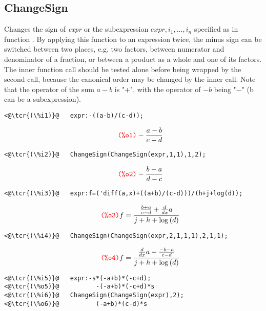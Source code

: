 \documentclass[../Maxima_Workbook.tex]{subfiles}
\begin{document}
\subsection{ChangeSign}

\lz {} \hfill {}

\lz Changes the sign of \emph{expr} or the subexpression $ expr, i_1,\dots,i_n $ specified as in function . By applying this function to an expression twice, the minus sign can be switched between two places, e.g. two factors, between numerator and denominator of a fraction, or between a product as a whole and one of its factors. The inner function call should be tested alone before being wrapped by the second call, because the canonical order may be changed by the inner call. Note that the operator of the sum $ a-b $ is "+", with the operator of $ -b $ being "$ - $" (b can be a subexpression). 

\lz \begin{small}
\color{blue} \leqn
\begin{lstlisting}
<@\tcr{(\%i1)}@   expr:-((a-b)/(c-d));
\end{lstlisting}
\vspace{-5mm} \[\tag*{\tcr{\ttfamily (\%o1)}} -\frac{a-b}{c-d} \]
\vspace{-6mm} 
\begin{lstlisting}
<@\tcr{(\%i2)}@   ChangeSign(ChangeSign(expr,1,1),1,2);
\end{lstlisting}
\vspace{-5mm} \[\tag*{\tcr{\ttfamily (\%o2)}} -\frac{b-a}{d-c} \]
\vspace{-6mm} 
\begin{lstlisting}
<@\tcr{(\%i3)}@   expr:f=('diff(a,x)+((a+b)/(c-d)))/(h+j+log(d));
\end{lstlisting}
\vspace{-4mm} \[\tag*{\tcr{\ttfamily (\%o3)}} f=\frac{\frac{b+a}{c-d}+\frac{d}{d x} a}{j+h+\log{(d)}} \]
\vspace{-5mm} 
\begin{lstlisting}
<@\tcr{(\%i4)}@   ChangeSign(ChangeSign(expr,2,1,1,1),2,1,1);
\end{lstlisting}
\vspace{-4mm} \[\tag*{\tcr{\ttfamily (\%o4)}} f=\frac{\frac{d}{d x} a-\frac{-b-a}{c-d}}{j+h+\log{(d)}} \]
\vspace{-6mm} 
\begin{lstlisting}
<@\tcr{(\%i5)}@   expr:-s*(-a+b)*(-c+d);
<@\tcr{(\%o5)}@			 -(-a+b)*(-c+d)*s
<@\tcr{(\%i6)}@   ChangeSign(ChangeSign(expr),2);
<@\tcr{(\%o6)}@			 (-a+b)*(c-d)*s
\end{lstlisting} 
\color{black} \reqn
\end{small}
\end{document}

